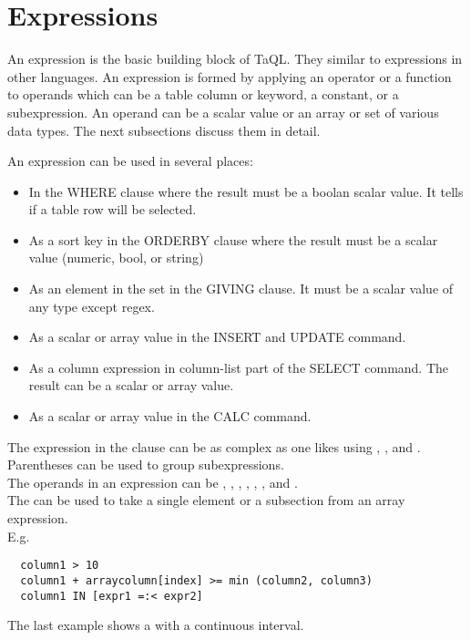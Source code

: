 \section{\label{TAQL:EXPRESSIONS}Expressions}
An expression is the basic building block of TaQL. They similar to
expressions in other languages. An expression is formed by
applying an operator or a function to operands which can be
a table column or keyword, a constant, or a subexpression.
An operand can be a scalar value or an array or set of various data types.
The next subsections discuss them in detail.

An expression can be used in several places:
\begin{itemize}
\item In the WHERE clause where the result must be a boolan scalar value. It
tells if a table row will be selected.
\item As a sort key in the ORDERBY clause where the result must be a
  scalar value (numeric, bool, or string)
\item As an element in the set in the GIVING clause. It must be a
  scalar value of any type except regex.
\item As a scalar or array value in the INSERT and UPDATE command.
\item As a column expression in column-list part of the SELECT
  command. The result can be a scalar or array value.
\item As a scalar or array value in the CALC command.
\end{itemize}

The expression in the clause can be as complex as one likes using
, 
, and .
Parentheses can be used to group subexpressions.
\\The operands in an expression can be
,
,
,
,
,
, and
.
\\The {} can be used to take a
single element or a subsection from an array expression.
\\E.g.
\begin{verbatim}
  column1 > 10
  column1 + arraycolumn[index] >= min (column2, column3)
  column1 IN [expr1 =:< expr2]
\end{verbatim}
The last example shows a  with a continuous interval.

